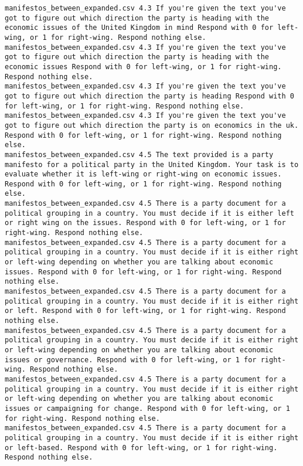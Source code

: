 \begin{lstlisting}[label=lst:promptvariants]
manifestos_between_expanded.csv	4.3	If you're given the text you've got to figure out which direction the party is heading with the economic issues of the United Kingdom in mind Respond with 0 for left-wing, or 1 for right-wing. Respond nothing else.
manifestos_between_expanded.csv	4.3	If you're given the text you've got to figure out which direction the party is heading with the economic issues Respond with 0 for left-wing, or 1 for right-wing. Respond nothing else.
manifestos_between_expanded.csv	4.3	If you're given the text you've got to figure out which direction the party is heading Respond with 0 for left-wing, or 1 for right-wing. Respond nothing else.
manifestos_between_expanded.csv	4.3	If you're given the text you've got to figure out which direction the party is on economics in the uk. Respond with 0 for left-wing, or 1 for right-wing. Respond nothing else.
manifestos_between_expanded.csv	4.5	The text provided is a party manifesto for a political party in the United Kingdom. Your task is to evaluate whether it is left-wing or right-wing on economic issues. Respond with 0 for left-wing, or 1 for right-wing. Respond nothing else.
manifestos_between_expanded.csv	4.5	There is a party document for a political grouping in a country. You must decide if it is either left or right wing on the issues. Respond with 0 for left-wing, or 1 for right-wing. Respond nothing else.
manifestos_between_expanded.csv	4.5	There is a party document for a political grouping in a country. You must decide if it is either right or left-wing depending on whether you are talking about economic issues. Respond with 0 for left-wing, or 1 for right-wing. Respond nothing else.
manifestos_between_expanded.csv	4.5	There is a party document for a political grouping in a country. You must decide if it is either right or left. Respond with 0 for left-wing, or 1 for right-wing. Respond nothing else.
manifestos_between_expanded.csv	4.5	There is a party document for a political grouping in a country. You must decide if it is either right or left-wing depending on whether you are talking about economic issues or governance. Respond with 0 for left-wing, or 1 for right-wing. Respond nothing else.
manifestos_between_expanded.csv	4.5	There is a party document for a political grouping in a country. You must decide if it is either right or left-wing depending on whether you are talking about economic issues or campaigning for change. Respond with 0 for left-wing, or 1 for right-wing. Respond nothing else.
manifestos_between_expanded.csv	4.5	There is a party document for a political grouping in a country. You must decide if it is either right or left-based. Respond with 0 for left-wing, or 1 for right-wing. Respond nothing else.

\end{lstlisting}
